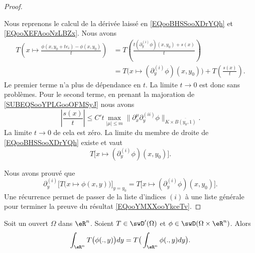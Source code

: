 \begin{proof}
\begin{subproof}
\begin{itemize}
		\end{itemize}
		Nous reprenons le calcul de la dérivée laissé en \eqref{EQooBHSSooXDrYQh} et \eqref{EQooXEFAooNzLBZx}. Nous avons
		\begin{subequations}
			\begin{align}
				T\left( x\mapsto\frac{ \phi(x,y_0+te_i)-\phi(x,y_0) }{ t } \right) & =T\left( \frac{ t(\partial_y^{(i)}\phi)(x,y_0)+s(x) }{ t }\right)                        \\
				                                                                   & =T\Big( x\mapsto (\partial_y^{(i)}\phi)(x,y_0) \Big)+T\left( \frac{ s(x) }{ t } \right).
			\end{align}
		\end{subequations}
		Le premier terme n'a plus de dépendance en \( t\). La limite \( t\to 0\) est donc sans problèmes. Pour le second terme, en prenant la majoration de \eqref{SUBEQSooYPLGooOFMSyJ} nous avons
		\begin{equation}
			| \frac{ s(x) }{ t } |\leq C't\max_{| \mu |\leq m}\| \partial_x^{\mu}\partial_y^{(ii)}\phi \|_{K\times \overline{ B(y_0,1) }}.
		\end{equation}
		La limite \( t\to 0\) de cela est zéro.
		\spitem[Conclusion]
		La limite du membre de droite de \eqref{EQooBHSSooXDrYQh} existe et vaut
		\begin{equation}
			T\Big[x\mapsto (\partial_y^{(i)}\phi)(x,y_0) \Big].
		\end{equation}
	\end{subproof}
	Nous avons prouvé que
	\begin{equation}
		\partial^{(i)}_y\Big[ T\big( x\mapsto\phi(x,y) \big) \Big]_{y=y_0}=T\Big[ x\mapsto (\partial^{(i)}_y\phi)(x,y_0) \Big].
	\end{equation}
	Une récurrence permet de passer de la liste d'indices \( (i)\) à une liste générale pour terminer la preuve du résultat \eqref{EQooYMXXooYkceTv}.
\end{proof}

\begin{theorem}
	Soit un ouvert \( \Omega\) dans \( \eR^n\). Soient \( T\in \swD'(\Omega)\) et \( \phi\in \swD(\Omega\times \eR^n)\). Alors
	\begin{equation}
		\int_{\eR^n}T\big( \phi(.,y) \big)dy=T\big( \int_{\eR^n}\phi(.,y)dy \big).
	\end{equation}
\end{theorem}

